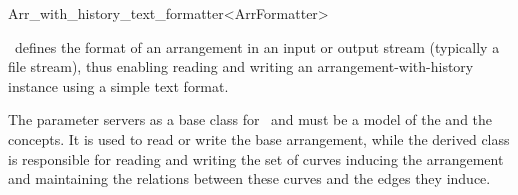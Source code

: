 
\ccRefPageBegin

\begin{ccRefClass}{Arr_with_history_text_formatter<ArrFormatter>}

\ccDefinition

\ccRefName\ defines the format of an arrangement in an input or output stream
(typically a file stream), thus enabling reading and writing an
arrangement-with-history instance using a simple text format.

The  parameter servers as a base class for
\ccRefName\ and must be a model of the 
and the  concepts. It is used to read or write
the base arrangement, while the derived class is responsible for reading and
writing the set of curves inducing the arrangement and maintaining the
relations between these curves and the edges they induce.


\ccIsModel
     \\

\ccSeeAlso
     \\

\end{ccRefClass}

\ccRefPageEnd
